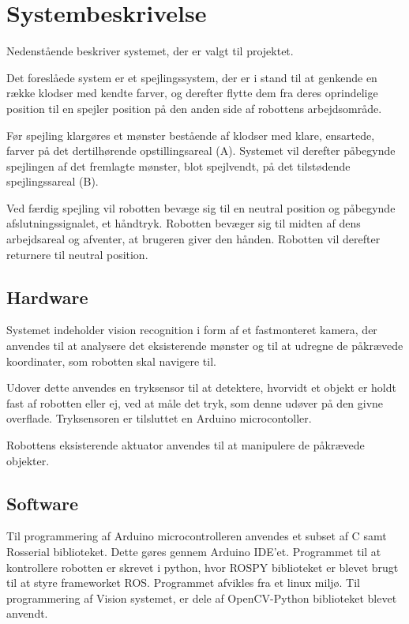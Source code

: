 \chapter{Systembeskrivelse}\label{chap:Systembeskrivelse}
Nedenstående beskriver systemet, der er valgt til projektet.
 
Det foreslåede system er et spejlingssystem, der er i stand til at genkende en række klodser med kendte farver, og derefter flytte dem fra deres oprindelige position til en spejler position på den anden side af robottens arbejdsområde. 

Før spejling klargøres et mønster bestående af klodser med klare, ensartede, farver på det dertilhørende opstillingsareal (A).
Systemet vil derefter påbegynde spejlingen af det fremlagte mønster, blot spejlvendt, på det tilstødende spejlingssareal (B).

Ved færdig spejling vil robotten bevæge sig til en neutral position og påbegynde
afslutningssignalet, et håndtryk. Robotten bevæger sig til midten af dens arbejdsareal og afventer, at brugeren giver den hånden. Robotten vil derefter returnere til neutral position. 

\section{Hardware}\label{sec:Hardware}
Systemet indeholder vision recognition i form af et fastmonteret kamera, der anvendes til at
analysere det eksisterende mønster og til at udregne de påkrævede koordinater, som robotten skal navigere til. 

Udover dette anvendes en tryksensor til at detektere, hvorvidt et objekt er holdt fast af robotten eller ej, ved at måle det tryk, som denne udøver på den givne overflade. Tryksensoren er tilsluttet en Arduino microcontoller.

Robottens eksisterende aktuator anvendes til at manipulere de påkrævede objekter.
\section{Software}\label{sec:Software}

Til programmering af Arduino microcontrolleren anvendes et subset af C samt Rosserial biblioteket. Dette gøres gennem Arduino IDE'et.
Programmet til at kontrollere robotten er skrevet i python, hvor ROSPY biblioteket er blevet brugt til at styre frameworket ROS. Programmet afvikles fra et linux miljø.
Til programmering af Vision systemet, er dele af OpenCV-Python biblioteket blevet anvendt. 